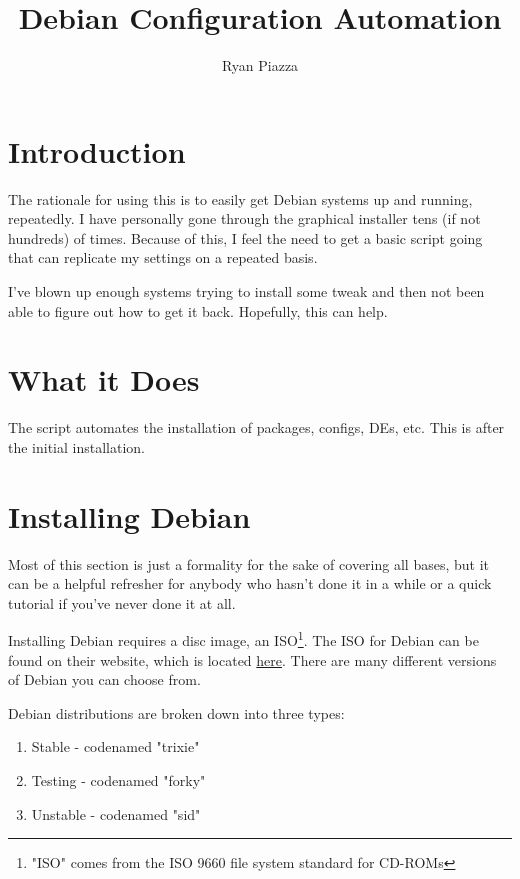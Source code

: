 \documentclass{article}
\title{Debian Configuration Automation}
\author{Ryan Piazza}
\begin{document}
\tableofcontents

\maketitle


\section{Introduction}

The rationale for using this is to easily get Debian systems up and running, repeatedly. I have personally gone through the graphical installer tens (if not hundreds) of times. Because of this, I feel the need to get a basic script going that can replicate my settings on a repeated basis. 

I've blown up enough systems trying to install some tweak and then not been able to figure out how to get it back. Hopefully, this can help. 

\section{What it Does}

The script automates the installation of packages, configs, DEs, etc. This is after the initial installation. 

\blindtext





\section{Installing Debian}

Most of this section is just a formality for the sake of covering all bases, but it can be a helpful refresher for anybody who hasn't done it in a while or a quick tutorial if you've never done it at all. 

Installing Debian requires a disc image, an ISO\footnote{"ISO" comes from the ISO 9660 file system standard for CD-ROMs}. The ISO for Debian can be found on their website, which is located \href{https://www.debian.org/distrib/}{here}. There are many different versions of Debian you can choose from. 

Debian distributions are broken down into three types:
\begin{enumerate}
    \item Stable - codenamed "trixie"
    \item Testing - codenamed "forky"
    \item Unstable - codenamed "sid"
\end{enumerate}
\end{document}
